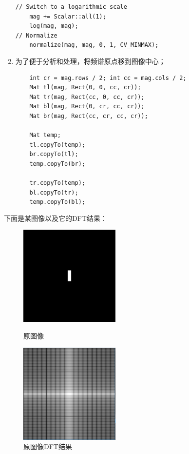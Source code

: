 \documentclass[hyperref,UTF8]{ctexart}
\begin{document}
\begin{enumerate}
\begin{lstlisting}
// Switch to a logarithmic scale
	mag += Scalar::all(1);
	log(mag, mag);
// Normalize
	normalize(mag, mag, 0, 1, CV_MINMAX);
\end{lstlisting}
\item 为了便于分析和处理，将频谱原点移到图像中心；

\begin{lstlisting}
	int cr = mag.rows / 2; int cc = mag.cols / 2;
	Mat tl(mag, Rect(0, 0, cc, cr));
	Mat tr(mag, Rect(cc, 0, cc, cr));
	Mat bl(mag, Rect(0, cr, cc, cr));
	Mat br(mag, Rect(cc, cr, cc, cr));

	Mat temp;
	tl.copyTo(temp);
	br.copyTo(tl);
	temp.copyTo(br);

	tr.copyTo(temp);
	bl.copyTo(tr);
	temp.copyTo(bl);

\end{lstlisting}

\end{enumerate}

下面是某图像以及它的DFT结果：

\begin{figure}[H]
\centering
\begin{varwidth}[t]{\textwidth}
\vspace{0pt}
\includegraphics[height=5cm]{rect.png}
\caption{原图像}
\label{fig:rect}
\end{varwidth}%
\quad
\begin{varwidth}[t]{\textwidth}
\vspace{0pt}
\centering
\includegraphics[height=5cm]{rectDFT.png}
\caption{原图像DFT结果}
\label{fig:rectDFT}
\end{varwidth}
\end{figure}
\end{document}
